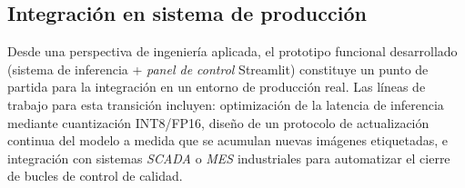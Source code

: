 \subsection{Integración en sistema de producción}

Desde una perspectiva de ingeniería aplicada, el prototipo funcional desarrollado (sistema de inferencia + \textit{panel de control} Streamlit) constituye un punto de partida para la integración en un entorno de producción real. Las líneas de trabajo para esta transición incluyen: optimización de la latencia de inferencia mediante cuantización INT8/FP16, diseño de un protocolo de actualización continua del modelo a medida que se acumulan nuevas imágenes etiquetadas, e integración con sistemas \textit{SCADA} o \textit{MES} industriales para automatizar el cierre de bucles de control de calidad.
